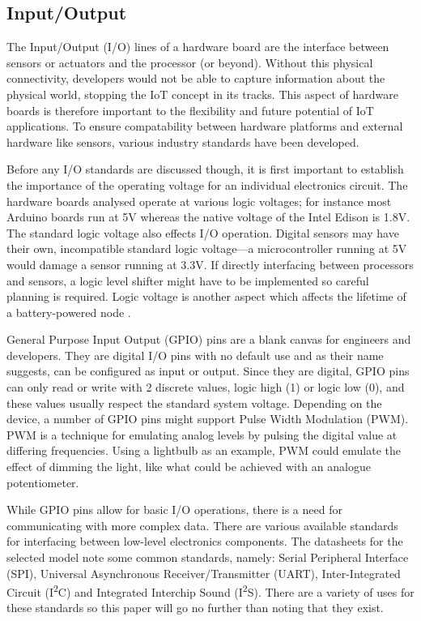     \subsection{Input/Output}
      The Input/Output (I/O) lines of a hardware board are the interface between sensors or actuators and the processor (or beyond). Without this physical connectivity, developers would not be able to capture information about the physical world, stopping the IoT concept in its tracks. This aspect of hardware boards is therefore important to the flexibility and future potential of IoT applications. To ensure compatability between hardware platforms and external hardware like sensors, various industry standards have been developed.

      Before any I/O standards are discussed though, it is first important to establish the importance of the operating voltage for an individual electronics circuit. The hardware boards analysed operate at various logic voltages; for instance most Arduino boards run at 5V whereas the native voltage of the Intel Edison is 1.8V. The standard logic voltage also effects I/O operation. Digital sensors may have their own, incompatible standard logic voltage---a microcontroller running at 5V would damage a sensor running at 3.3V. If directly interfacing between processors and sensors, a logic level shifter might have to be implemented so careful planning is required. Logic voltage is another aspect which affects the lifetime of a battery-powered node \citep{wsnpower:2010}.

      General Purpose Input Output (GPIO) pins are a blank canvas for engineers and developers. They are digital I/O pins with no default use and as their name suggests, can be configured as input or output. Since they are digital, GPIO pins can only read or write with 2 discrete values, logic high (1) or logic low (0), and these values usually respect the standard system voltage. Depending on the device, a number of GPIO pins might support Pulse Width Modulation (PWM). PWM is a technique for emulating analog levels by pulsing the digital value at differing frequencies. Using a lightbulb as an example, PWM could emulate the effect of dimming the light, like what could be achieved with an analogue potentiometer.

      While GPIO pins allow for basic I/O operations, there is a need for communicating with more complex data. There are various available standards for interfacing between low-level electronics components. The datasheets for the selected model note some common standards, namely: Serial Peripheral Interface (SPI), Universal Asynchronous Receiver/Transmitter (UART), Inter-Integrated Circuit (I\textsuperscript{2}C) and Integrated Interchip Sound (I\textsuperscript{2}S). There are a variety of uses for these standards so this paper will go no further than noting that they exist.


